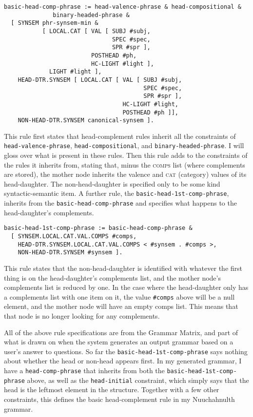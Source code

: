 \begin{verbatim}
basic-head-comp-phrase := head-valence-phrase & head-compositional &
              binary-headed-phrase &
  [ SYNSEM phr-synsem-min &
           [ LOCAL.CAT [ VAL [ SUBJ #subj,
                               SPEC #spec,
                               SPR #spr ],
                         POSTHEAD #ph,
                         HC-LIGHT #light ],
             LIGHT #light ],
    HEAD-DTR.SYNSEM [ LOCAL.CAT [ VAL [ SUBJ #subj,
                                        SPEC #spec,
                                        SPR #spr ],
                                  HC-LIGHT #light,
                                  POSTHEAD #ph ]],
    NON-HEAD-DTR.SYNSEM canonical-synsem ].
\end{verbatim}

\noindent This rule first states that head-complement rules inherit all the constraints of \texttt{head-valence-phrase}, \texttt{head-compositional}, and \texttt{binary-headed-phrase}. I will gloss over what is present in these rules. Then this rule adds to the constraints of the rules it inherits from, stating that, minus the \textsc{comps} list (where complements are stored), the mother node inherits the valence and \textsc{cat} (category) values of its head-daughter. The non-head-daughter is specified only to be some kind syntactic-semantic item. A further rule, the \texttt{basic-head-1st-comp-phrase}, inherits from the \texttt{basic-head-comp-phrase} and specifies what happens to the head-daughter's complements.

\begin{verbatim}
basic-head-1st-comp-phrase := basic-head-comp-phrase &
  [ SYNSEM.LOCAL.CAT.VAL.COMPS #comps,
    HEAD-DTR.SYNSEM.LOCAL.CAT.VAL.COMPS < #synsem . #comps >,
    NON-HEAD-DTR.SYNSEM #synsem ].
\end{verbatim}

\noindent This rule states that the non-head-daughter is identified with whatever the first thing is on the head-daughter's complements list, and the mother node's complements list is reduced by one. In the case where the head-daughter only has a complements list with one item on it, the value \texttt{\#comps} above will be a null element, and the mother node will have an empty comps list. This means that that node is no longer looking for any complements.

All of the above rule specifications are from the Grammar Matrix, and part of what is drawn on when the system generates an output grammar based on a user's answer to questions. So far the \texttt{basic-head-1st-comp-phrase} says nothing about whether the head or non-head appears first. In my generated grammar, I have a \texttt{head-comp-phrase} that inherits from both the \texttt{basic-head-1st-comp-phrase} above, as well as the \texttt{head-initial} constraint, which simply says that the head is the leftmost element in the structure. Together with a few other constraints, this defines the basic head-complement rule in my Nuuchahnulth grammar.

